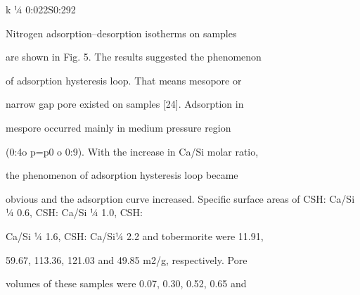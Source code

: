 \documentclass[a4paper,portrait,12pt]{article}
\begin{document}
\begin{flushleft}
k ¼ 0:022S0:292
\end{flushleft}





\begin{flushleft}
Nitrogen adsorption--desorption isotherms on samples
\end{flushleft}


\begin{flushleft}
are shown in Fig. 5. The results suggested the phenomenon
\end{flushleft}


\begin{flushleft}
of adsorption hysteresis loop. That means mesopore or
\end{flushleft}


\begin{flushleft}
narrow gap pore existed on samples [24]. Adsorption in
\end{flushleft}


\begin{flushleft}
mespore occurred mainly in medium pressure region
\end{flushleft}


\begin{flushleft}
(0:4o p=p0 o 0:9). With the increase in Ca/Si molar ratio,
\end{flushleft}


\begin{flushleft}
the phenomenon of adsorption hysteresis loop became
\end{flushleft}


\begin{flushleft}
obvious and the adsorption curve increased. Speciﬁc surface areas of CSH: Ca/Si ¼ 0.6, CSH: Ca/Si ¼ 1.0, CSH:
\end{flushleft}


\begin{flushleft}
Ca/Si ¼ 1.6, CSH: Ca/Si¼ 2.2 and tobermorite were 11.91,
\end{flushleft}


\begin{flushleft}
59.67, 113.36, 121.03 and 49.85 m2/g, respectively. Pore
\end{flushleft}


\begin{flushleft}
volumes of these samples were 0.07, 0.30, 0.52, 0.65 and
\end{flushleft}
\end{document}
